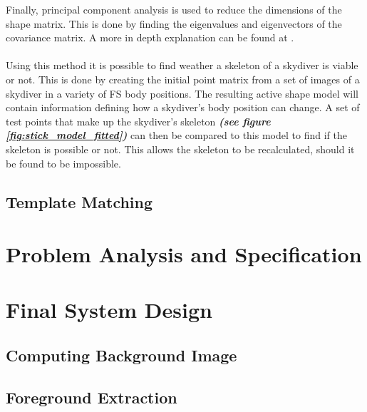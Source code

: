 \documentclass[a4paper, 12pt]{article}
\begin{document}
Finally, principal component analysis is used to reduce the dimensions of the shape matrix. This is done by finding the eigenvalues and eigenvectors of the covariance matrix. A more in depth explanation can be found at \cite{icl_pca}.\\
\\
Using this method it is possible to find weather a skeleton of a skydiver is viable or not. This is done by creating the initial point matrix from a set of images of a skydiver in a variety of FS body positions. The resulting active shape model will contain information defining how a skydiver's body position can change. A set of test points that make up the skydiver's skeleton \textbf{\emph{(see figure \ref{fig:stick_model_fitted})}} can then be compared to this model to find if the skeleton is possible or not. This allows the skeleton to be recalculated, should it be found to be impossible.
%
%
\subsection{Template Matching}


\section{Problem Analysis and Specification}
\section{Final System Design}

	\subsection{Computing Background Image}
	\subsection{Foreground Extraction}
\end{document}
